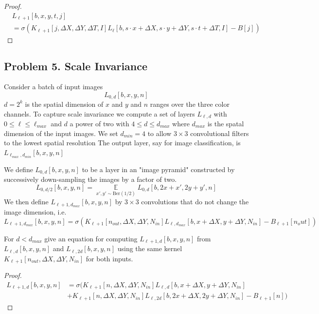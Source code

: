 \documentclass{amsart}
\DeclareMathOperator{\ee}{\mathbb{E}}
\theoremstyle{definition}
\begin{document}
\begin{proof}
   \[
   \]
   \begin{align*}
    &L_{\ell + 1} [b, x, y, t, j] \\
    &= \sigma(K_{\ell + 1} [j, \Delta X, \Delta Y, \Delta T, I] L_{\ell}[b, s \cdot x + \Delta X, s \cdot y + \Delta Y, s \cdot t + \Delta T, I] - B[j])
   \end{align*}
\end{proof}

\subsection*{Problem 5. Scale Invariance}
Consider a batch of input images 
\[
L_{0, d}[b,x,y,n]
\]
$d = 2^k$ is the spatial dimension of $x$ and $y$ and $n$ ranges over the three color channels. 
To capture scale invariance we compute a set of layers $L_{\ell, d}$ with $0 \le \ell \le \ell_{max}$ and $d$ a power of two with $4 \le d \le d_{max}$ where $d_{max}$ is the spatal dimension of the input images.
We set $d_{min} = 4$ to allow $3 \times 3$ convolutional filters to the lowest spatial resolution
The output layer, say for image classification, is $L_{\ell_{max}, d_{min}}[b, x, y, n]$

We define $L_{0, d}[b, x, y, n]$ to be a layer in an "image pyramid" constructed by successively down-sampling the images by a factor of two. 
\[
L_{0, d/2}[b, x, y, n] = \underset{x', y' \sim \mathrm{Ber(1/2)}}{\ee}L_{0, d}[b, 2x + x', 2y + y', n]
\]
We then define $L_{\ell + 1, d_{max}}[b, x, y, n]$ by $3 \times 3$ convolutions that do not change the image dimension, i.e. 
\[
L_{\ell + 1, d_{max}} [b, x, y, n] = \sigma(
    K_{\ell + 1}[n_{out}, \Delta X, \Delta Y, N_{in}] L_{\ell, d_{max}}[b, x + \Delta X, y + \Delta Y, N_{in}] - B_{\ell + 1} [n_out]
)
\]

For $ d < d_{max}$ give an equation for computing $L_{\ell + 1, d}[b, x, y, n]$ from 
$L_{\ell, d}[b, x, y, n]$ and $L_{\ell, 2d}[b, x, y, n]$ using the same kernel $K_{\ell + 1}[n_{out}, \Delta X, \Delta Y, N_{in}]$ for both inputs.

\begin{proof}
    \begin{align*}
        L_{\ell + 1, d}[b, x, y, n] &= \sigma(
        K_{\ell + 1}[n, \Delta X, \Delta Y, N_{in}] L_{\ell, d}[b, x + \Delta X, y + \Delta Y, N_{in}] \\
        &+K_{\ell + 1}[n, \Delta X, \Delta Y, N_{in}] L_{\ell, 2d}[b, 2x + \Delta X, 2y + \Delta Y, N_{in}] - B_{\ell + 1} [n]
        )
    \end{align*}
\end{proof}
\end{document}
